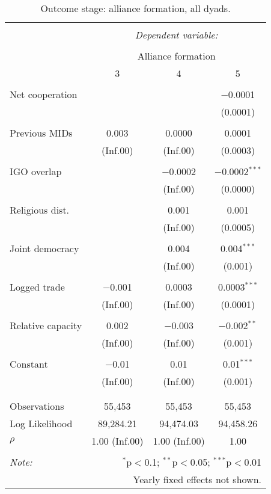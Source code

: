 \documentclass[10pt,]{article}
\begin{document}
\begin{table}[!htbp] \centering 
  \caption{\label{tab:AllyOutcomeAllDyads}Outcome stage: alliance formation, all dyads.} 
  \label{} 
\begin{tabular}{@{\extracolsep{5pt}}lccc} 
\\[-1.8ex]\hline 
\hline \\[-1.8ex] 
 & \multicolumn{3}{c}{\textit{Dependent variable:}} \\ 
\cline{2-4} 
\\[-1.8ex] & \multicolumn{3}{c}{Alliance formation} \\ 
 & 3 & 4 & 5 \\ 
\hline \\[-1.8ex] 
 Net cooperation &  &  & $-$0.0001 \\ 
  &  &  & (0.0001) \\ 
  & & & \\ 
 Previous MIDs & 0.003 & 0.0000 & 0.0001 \\ 
  & (Inf.00) & (Inf.00) & (0.0003) \\ 
  & & & \\ 
 IGO overlap &  & $-$0.0002 & $-$0.0002$^{***}$ \\ 
  &  & (Inf.00) & (0.0000) \\ 
  & & & \\ 
 Religious dist. &  & 0.001 & 0.001 \\ 
  &  & (Inf.00) & (0.0005) \\ 
  & & & \\ 
 Joint democracy &  & 0.004 & 0.004$^{***}$ \\ 
  &  & (Inf.00) & (0.001) \\ 
  & & & \\ 
 Logged trade & $-$0.001 & 0.0003 & 0.0003$^{***}$ \\ 
  & (Inf.00) & (Inf.00) & (0.0001) \\ 
  & & & \\ 
 Relative capacity & 0.002 & $-$0.003 & $-$0.002$^{**}$ \\ 
  & (Inf.00) & (Inf.00) & (0.001) \\ 
  & & & \\ 
 Constant & $-$0.01 & 0.01 & 0.01$^{***}$ \\ 
  & (Inf.00) & (Inf.00) & (0.001) \\ 
  & & & \\ 
\hline \\[-1.8ex] 
Observations & 55,453 & 55,453 & 55,453 \\ 
Log Likelihood & 89,284.21 & 94,474.03 & 94,458.26 \\ 
$\rho$ & 1.00  (Inf.00) & 1.00  (Inf.00) & 1.00 \\ 
\hline 
\hline \\[-1.8ex] 
\textit{Note:}  & \multicolumn{3}{r}{$^{*}$p$<$0.1; $^{**}$p$<$0.05; $^{***}$p$<$0.01} \\ 
 & \multicolumn{3}{r}{Yearly fixed effects not shown.} \\ 
\end{tabular} 
\end{table}
\end{document}
